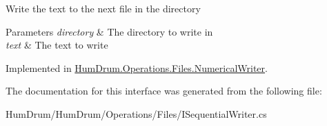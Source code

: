 Write the text to the next file in the directory 


\begin{DoxyParams}{Parameters}
{\em directory} & The directory to write in\\
\hline
{\em text} & The text to write\\
\hline
\end{DoxyParams}


Implemented in \hyperlink{classHumDrum_1_1Operations_1_1Files_1_1NumericalWriter_a27becb60062cf9556fcb4063c0baf3af}{Hum\+Drum.\+Operations.\+Files.\+Numerical\+Writer}.



The documentation for this interface was generated from the following file\+:\begin{DoxyCompactItemize}
\item 
Hum\+Drum/\+Hum\+Drum/\+Operations/\+Files/I\+Sequential\+Writer.\+cs\end{DoxyCompactItemize}
